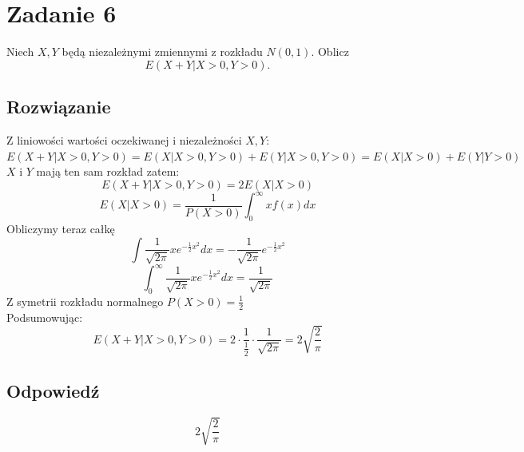 \section{Zadanie 6}
Niech \(X,Y\) będą niezależnymi zmiennymi z rozkładu \(N(0,1)\). Oblicz
\[
	E(X+Y| X > 0, Y>0).
\]

\subsection*{Rozwiązanie}
Z liniowości wartości oczekiwanej i niezależności \(X,Y\):\\
\(E(X+Y|X>0, Y>0) = E(X|X>0, Y>0) + E(Y|X>0, Y>0) = E(X|X>0) + E(Y|Y>0)\)\\
\(X\) i \(Y\) mają ten sam rozkład zatem:\\
\[
	E(X+Y|X>0, Y>0) = 2E(X|X>0)
\]
\[
	E(X|X>0) = \frac{1}{P(X>0)}\int_0^{\infty}{xf(x)dx}
\]
Obliczymy teraz całkę\\
\[
	\int{\frac{1}{\sqrt{2\pi}}xe^{-\frac{1}{2}x^2}dx} = -\frac{1}{\sqrt{2\pi}}e^{-\frac{1}{2}x^2}
\]
\[
	\int_0^{\infty}{\frac{1}{\sqrt{2\pi}}xe^{-\frac{1}{2}x^2}dx} = \frac{1}{\sqrt{2\pi}}
\]
Z symetrii rozkładu normalnego \(P(X>0) = \frac{1}{2}\)\\
Podsumowując:\\
\[
	E(X+Y|X>0, Y>0) = 2 \cdot \frac{1}{\frac{1}{2}}\cdot\frac{1}{\sqrt{2\pi}} = 2\sqrt{\frac{2}{\pi}}
\]

\subsection*{Odpowiedź}
\[
	\boxed{\text{\(2\sqrt{\frac{2}{\pi}}\)}}
\]
